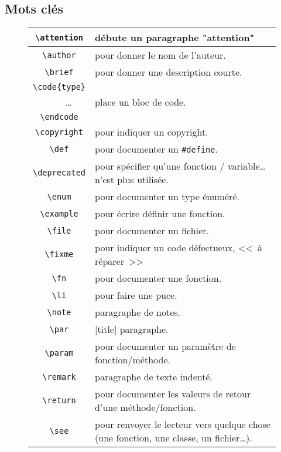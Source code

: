 		\subsection{Mots clés}
			\begin{figure}[H]
				\begin{changemargin}{-2.5cm}{-2.5cm}
				\begin{tabular}{@{\extracolsep{\fill}} | c || l | }
					\hline
					\verb+\attention+ & débute un paragraphe "attention" \\ \hline
					\verb+\author+ & pour donner le nom de l'auteur. \\ \hline
					\verb+\brief+ & pour donner une description courte. \\ \hline
					\verb+\code{type}+ & \\
					\verb+    +\dots & place un bloc de code. \\
					\verb+\endcode+ & \\ \hline
					\verb+\copyright+ & pour indiquer un copyright. \\ \hline
					\verb+\def+ & pour documenter un \verb+#define+. \\ \hline
					\verb+\deprecated+ & pour spécifier qu'une fonction / variable\dots n'est plus utilisée. \\ \hline
					\verb+\enum+ & pour documenter un type énuméré. \\ \hline
					\verb+\example+ & pour écrire définir une fonction. \\ \hline
					\verb+\file+ & pour documenter un fichier. \\ \hline
					\verb+\fixme+ & pour indiquer un code défectueux, << à réparer >> \\ \hline
					\verb+\fn+ & pour documenter une fonction. \\ \hline
					\verb+\li+ & pour faire une puce. \\ \hline
					\verb+\note+ & paragraphe de notes. \\ \hline
					\verb+\par+ & [title] paragraphe. \\ \hline
					\verb+\param+ & pour documenter un paramètre de fonction/méthode. \\ \hline
					\verb+\remark+ & paragraphe de texte indenté. \\ \hline
					\verb+\return+ & pour documenter les valeurs de retour d'une méthode/fonction. \\ \hline
					\verb+\see+ & pour renvoyer le lecteur vers quelque chose (une fonction, une classe, un fichier\dots). \\ \hline

\end{tabular}
\end{changemargin}
\end{figure}
